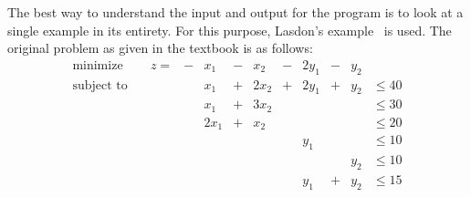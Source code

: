 \documentclass[11pt]{article} %
\begin{document}
The best way to understand the input and output for the program is to look at a single example in its entirety.  For this purpose, Lasdon's example~\cite{Lasdon70} is used.  The original problem as given in the textbook is as follows:
\begin{align}
\text{minimize}& \quad z =& -&x_1 &- &x_2& - &2y_1 &- &y_2 \nonumber \\
\text{subject to}& \quad& &x_1 &+ &2x_2 &+&2y_1& +& y_2 &\le 40 \label{eqnExConnecting}\\
&&&x_1 &+ &3x_2&&&&&\le30 \label{eqnExSub1a}\\
&&&2x_1 &+ &x_2&&&&&\le20 \label{eqnExSub1b}\\
&&&&&&&y_1&&&\le10\label{eqnExSub2a} \\
&&&&&&&&&y_2&\le10 \label{eqnExSub2b}\\
&&&&&&&y_1&+&y_2&\le15 \label{eqnExSub2c}
\end{align}
\end{document}
